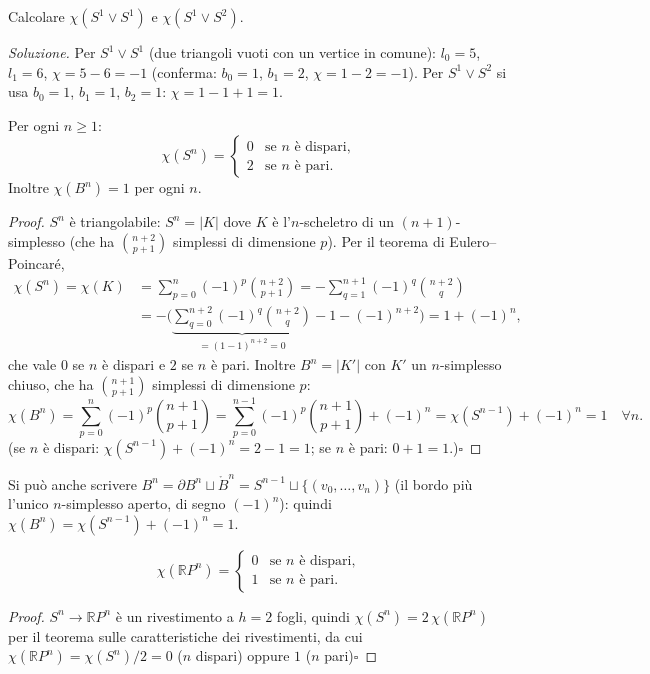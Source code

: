 \begin{ejercicio*}
Calcolare $\chi(S^1 \vee S^1)$ e $\chi(S^1 \vee S^2)$.
\end{ejercicio*}
\textit{Soluzione.} Per $S^1 \vee S^1$ (due triangoli vuoti con un vertice in comune): $l_0 = 5$, $l_1 = 6$, $\chi = 5 - 6 = -1$ (conferma: $b_0 = 1$, $b_1 = 2$, $\chi = 1 - 2 = -1$). Per $S^1 \vee S^2$ si usa $b_0 = 1$, $b_1 = 1$, $b_2 = 1$: $\chi = 1 - 1 + 1 = 1$.

\begin{teo}
Per ogni $n \geqslant 1$:
\[
\chi(S^n) = \begin{cases} 0 & \text{se } n \text{ \`e dispari}, \\ 2 & \text{se } n \text{ \`e pari}. \end{cases}
\]
Inoltre $\chi(B^n) = 1$ per ogni $n$.
\end{teo}
\begin{proof}
$S^n$ \`e triangolabile: $S^n = |K|$ dove $K$ \`e l'$n$-scheletro di un $(n+1)$-simplesso (che ha $\binom{n+2}{p+1}$ simplessi di dimensione $p$). Per il teorema di Eulero--Poincar\'e,
\[
\begin{aligned}
\chi(S^n) = \chi(K) &= \sum_{p=0}^n (-1)^p \binom{n+2}{p+1} = - \sum_{q=1}^{n+1} (-1)^q \binom{n+2}{q} \\
&= - \Big( \underbrace{\sum_{q=0}^{n+2} (-1)^q \binom{n+2}{q}}_{=(1-1)^{n+2} = 0} - 1 - (-1)^{n+2} \Big) = 1 + (-1)^n ,
\end{aligned}
\]
che vale $0$ se $n$ \`e dispari e $2$ se $n$ \`e pari. Inoltre $B^n = |K'|$ con $K'$ un $n$-simplesso chiuso, che ha $\binom{n+1}{p+1}$ simplessi di dimensione $p$:
\[
\chi(B^n) = \sum_{p=0}^n (-1)^p \binom{n+1}{p+1} = \sum_{p=0}^{n-1} (-1)^p \binom{n+1}{p+1} + (-1)^n = \chi(S^{n-1}) + (-1)^n = 1 \quad \forall n .
\]
(se $n$ \`e dispari: $\chi(S^{n-1}) + (-1)^n = 2 - 1 = 1$; se $n$ \`e pari: $0 + 1 = 1$.)\hfill$\square$
\end{proof}

\begin{observacion}
Si pu\`o anche scrivere $B^n = \partial B^n \sqcup \mathring{B}^n = S^{n-1} \sqcup \{ (v_0, \dots, v_n) \}$ (il bordo pi\`u l'unico $n$-simplesso aperto, di segno $(-1)^n$): quindi $\chi(B^n) = \chi(S^{n-1}) + (-1)^n = 1$.
\end{observacion}

\begin{coro}
\[
\chi(\mathbb{R}P^n) = \begin{cases} 0 & \text{se } n \text{ \`e dispari}, \\ 1 & \text{se } n \text{ \`e pari}. \end{cases}
\]
\end{coro}
\begin{proof}
$S^n \to \mathbb{R}P^n$ \`e un rivestimento a $h = 2$ fogli, quindi $\chi(S^n) = 2\,\chi(\mathbb{R}P^n)$ per il teorema sulle caratteristiche dei rivestimenti, da cui $\chi(\mathbb{R}P^n) = \chi(S^n)/2 = 0$ ($n$ dispari) oppure $1$ ($n$ pari)\hfill$\square$
\end{proof}

